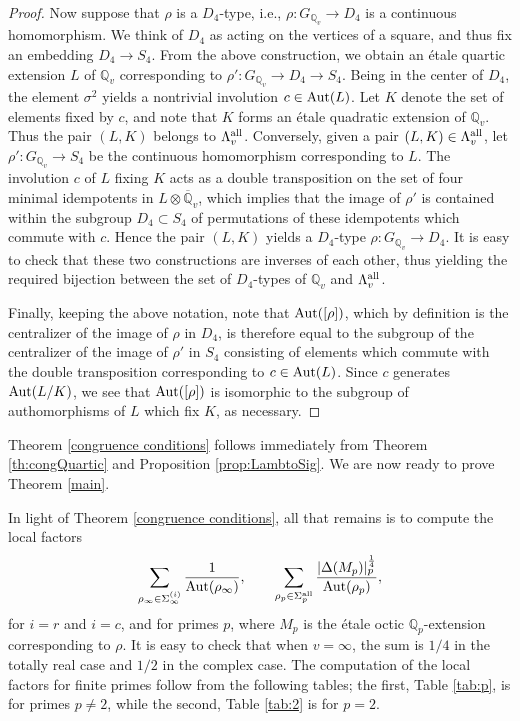 \documentclass[10pt]{article}
\theoremstyle{plain}
\theoremstyle{definition}
\theoremstyle{remark}
\DeclareMathOperator{\Aut}{Aut}
\def\all{{\rm all}}
\def\Aut{{\rm Aut}}
\def\Q{{\mathbb Q}}
\def\Q{{\mathbb Q}}
\begin{document}
\begin{proof}
Now suppose that $\rho$ is a $D_4$-type, i.e., $\rho:G_{\Q_v}\to D_4$ is a continuous homomorphism. We think of $D_4$ as acting on the vertices of a square, and thus fix an embedding $D_4\to S_4$. From the above construction, we obtain an \'etale quartic extension $L$ of $\Q_v$ corresponding to $\rho':G_{\Q_v}\to D_4\to S_4$. Being in the center of $D_4$, the element $\sigma^2$ yields a nontrivial involution $c\in\Aut(L)$. Let $K$ denote the set of elements fixed by $c$, and note that $K$ forms an \'etale quadratic extension of $\Q_v$. Thus the pair $(L,K)$ belongs to $\Lambda_v^\all$. Conversely, given a pair $(L,K)\in\Lambda_v^\all$, let $\rho':G_{\Q_v}\to S_4$ be the continuous homomorphism corresponding to $L$. The involution $c$ of $L$ fixing $K$ acts as a double transposition on the set of four minimal idempotents in $L\otimes\overline{\Q}_v$, which implies that the image of $\rho'$ is contained within the subgroup $D_4\subset S_4$ of permutations of these idempotents which commute with $c$. Hence the pair $(L,K)$ yields a $D_4$-type $\rho:G_{\Q_v}\to D_4$. It is easy to check that these two constructions are inverses of each other, thus yielding the required bijection between the set of $D_4$-types of $\Q_v$ and $\Lambda_v^\all$.

Finally, keeping the above notation, note that $\Aut([\rho])$, which by definition is the centralizer of the image of $\rho$ in $D_4$, is therefore equal to the subgroup of the centralizer of the image of $\rho'$ in $S_4$ consisting of elements which commute with the double transposition corresponding to $c\in\Aut(L)$. Since $c$ generates $\Aut(L/K)$, we see that $\Aut([\rho])$ is isomorphic to the subgroup of authomorphisms of $L$ which fix $K$, as necessary.
\end{proof}

Theorem \ref{congruence conditions} follows immediately from Theorem \ref{th:congQuartic} and Proposition \ref{prop:LambtoSig}. We are now ready to prove Theorem \ref{main}.

\medskip

 In light of Theorem \ref{congruence conditions}, all that remains is to compute the local factors
\begin{equation*}
\sum_{\rho_\infty\in\Sigma_\infty^{(i)}}\frac{1}{\Aut(\rho_\infty)},\quad\quad
\sum_{\rho_p\in\Sigma_p^\all}\frac{|\Delta(M_p)|^\frac14_p}{\Aut(\rho_p)},
\end{equation*}
for $i=r$ and $i=c$, and for primes $p$, where $M_p$ is the \'etale octic $\Q_p$-extension corresponding to $\rho$. It is easy to check that when $v=\infty$, the sum is $1/4$ in the totally real case and $1/2$ in the complex case. The computation of the local factors for finite primes follow from the following tables; the first, Table \ref{tab:p}, is for primes $p\neq 2$, while the second, Table \ref{tab:2} is for $p=2$.
\end{document}
